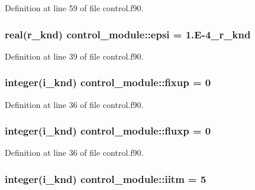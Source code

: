 Definition at line 59 of file control.\-f90.

\hypertarget{classcontrol__module_af1c813926ca0adb64361e5b48a4f73b9}{
\subsubsection[{epsi}]{\setlength{\rightskip}{0pt plus 5cm}real(r\-\_\-knd) control\-\_\-module\-::epsi = 1.\-E-\/4\-\_\-r\-\_\-knd}}\label{classcontrol__module_af1c813926ca0adb64361e5b48a4f73b9}


Definition at line 39 of file control.\-f90.

\hypertarget{classcontrol__module_ad305163b99235b021c5cf0f91e69c6d5}{
\subsubsection[{fixup}]{\setlength{\rightskip}{0pt plus 5cm}integer(i\-\_\-knd) control\-\_\-module\-::fixup = 0}}\label{classcontrol__module_ad305163b99235b021c5cf0f91e69c6d5}


Definition at line 36 of file control.\-f90.

\hypertarget{classcontrol__module_afb6375328be86057f0ac0af554c9abac}{
\subsubsection[{fluxp}]{\setlength{\rightskip}{0pt plus 5cm}integer(i\-\_\-knd) control\-\_\-module\-::fluxp = 0}}\label{classcontrol__module_afb6375328be86057f0ac0af554c9abac}


Definition at line 36 of file control.\-f90.

\hypertarget{classcontrol__module_a668776c82e56b5c08c95f01915287eb2}{
\subsubsection[{iitm}]{\setlength{\rightskip}{0pt plus 5cm}integer(i\-\_\-knd) control\-\_\-module\-::iitm = 5}}\label{classcontrol__module_a668776c82e56b5c08c95f01915287eb2}


